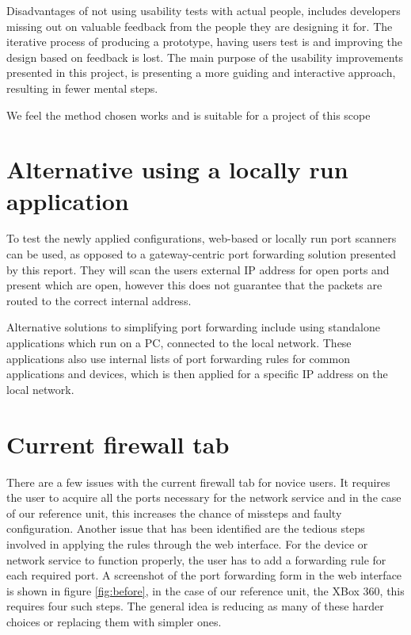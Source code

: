 \documentclass[a4paper,11pt,makeidx]{kth-bcs}
\begin{document}
Disadvantages of not using usability tests with actual people, includes developers missing out on valuable feedback from the people they are designing it for.
The iterative process of producing a prototype, having users test is and improving the design based on feedback is lost.
The main purpose of the usability improvements presented in this project, is presenting a more guiding and interactive approach, resulting in fewer mental steps.

We feel the method chosen works and is suitable for a project of this scope

\section{Alternative using a locally run application}
To test the newly applied configurations, web-based or locally run port scanners can be used, as opposed to a gateway-centric port forwarding solution presented by this report.
They will scan the users external IP address for open ports and present which are open, however this does not guarantee that the packets are routed to the correct internal address.

Alternative solutions to simplifying port forwarding include using standalone applications which run on a PC, connected to the local network.
These applications also use internal lists of port forwarding rules for common applications and devices, which is then applied for a specific IP address on the local network.\cite{portforward.com}


\section{Current firewall tab}
There are a few issues with the current firewall tab for novice users.
It requires the user to acquire all the ports necessary for the network service and in the case of our reference unit, this increases the chance of missteps and faulty configuration.
Another issue that has been identified are the tedious steps involved in applying the rules through the web interface.
For the device or network service to function properly, the user has to add a forwarding rule for each required port.
A screenshot of the port forwarding form in the web interface is shown in figure \ref{fig:before}, in the case of our reference unit, the XBox 360, this requires four such steps.
The general idea is reducing as many of these harder choices or replacing them with simpler ones.
\end{document}
